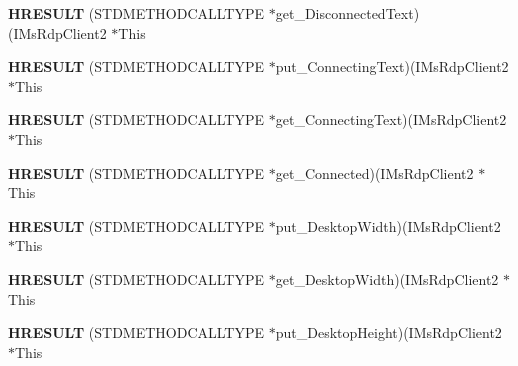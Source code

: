 \begin{DoxyCompactItemize}
\item 
\mbox{\label{struct_i_ms_rdp_client2_vtbl_a79fb17109869a5e67f7c609b178ddc23}} 
{\bfseries H\+R\+E\+S\+U\+LT} (S\+T\+D\+M\+E\+T\+H\+O\+D\+C\+A\+L\+L\+T\+Y\+PE $\ast$get\+\_\+\+Disconnected\+Text)(I\+Ms\+Rdp\+Client2 $\ast$This
\item 
\mbox{\label{struct_i_ms_rdp_client2_vtbl_a954bda2f1459727400f5c1c113737902}} 
{\bfseries H\+R\+E\+S\+U\+LT} (S\+T\+D\+M\+E\+T\+H\+O\+D\+C\+A\+L\+L\+T\+Y\+PE $\ast$put\+\_\+\+Connecting\+Text)(I\+Ms\+Rdp\+Client2 $\ast$This
\item 
\mbox{\label{struct_i_ms_rdp_client2_vtbl_aa20780626e57d5c36beaff5c7ecbc51d}} 
{\bfseries H\+R\+E\+S\+U\+LT} (S\+T\+D\+M\+E\+T\+H\+O\+D\+C\+A\+L\+L\+T\+Y\+PE $\ast$get\+\_\+\+Connecting\+Text)(I\+Ms\+Rdp\+Client2 $\ast$This
\item 
\mbox{\label{struct_i_ms_rdp_client2_vtbl_a190b27d0723b6920b59f20bc66da0dab}} 
{\bfseries H\+R\+E\+S\+U\+LT} (S\+T\+D\+M\+E\+T\+H\+O\+D\+C\+A\+L\+L\+T\+Y\+PE $\ast$get\+\_\+\+Connected)(I\+Ms\+Rdp\+Client2 $\ast$This
\item 
\mbox{\label{struct_i_ms_rdp_client2_vtbl_a74036bd927c0111f44207bbb82f951b7}} 
{\bfseries H\+R\+E\+S\+U\+LT} (S\+T\+D\+M\+E\+T\+H\+O\+D\+C\+A\+L\+L\+T\+Y\+PE $\ast$put\+\_\+\+Desktop\+Width)(I\+Ms\+Rdp\+Client2 $\ast$This
\item 
\mbox{\label{struct_i_ms_rdp_client2_vtbl_a7bd107dcba4727f1d4c377f8fd0af663}} 
{\bfseries H\+R\+E\+S\+U\+LT} (S\+T\+D\+M\+E\+T\+H\+O\+D\+C\+A\+L\+L\+T\+Y\+PE $\ast$get\+\_\+\+Desktop\+Width)(I\+Ms\+Rdp\+Client2 $\ast$This
\item 
\mbox{\label{struct_i_ms_rdp_client2_vtbl_a6503b39056ea625d9dbe5ce9aaa767c1}} 
{\bfseries H\+R\+E\+S\+U\+LT} (S\+T\+D\+M\+E\+T\+H\+O\+D\+C\+A\+L\+L\+T\+Y\+PE $\ast$put\+\_\+\+Desktop\+Height)(I\+Ms\+Rdp\+Client2 $\ast$This
\item 
\mbox{\label{struct_i_ms_rdp_client2_vtbl_aba90e6f71c03607b8672f57f9f68f08e}} 

\end{DoxyCompactItemize}

